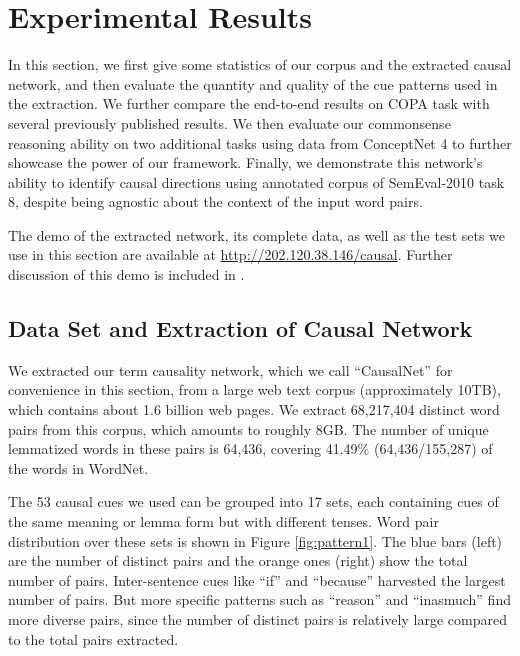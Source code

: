 \section{Experimental Results}
\label{sec:eval} In this section, we first give some statistics of
our corpus and the extracted causal network, and then evaluate the
quantity and quality of the cue patterns used in the extraction. We
further compare the end-to-end results on COPA task with several
previously published results. We then evaluate our commonsense reasoning
ability on two additional tasks using data from ConceptNet 4 to
further showcase the power of our framework. Finally, we demonstrate
this network's ability to identify causal directions
using annotated corpus of SemEval-2010 task 8, despite being
agnostic about the context of the input word pairs.

The demo of the extracted network, its complete data,
as well as the test sets we use in this section
are available at \url{http://202.120.38.146/causal}.
Further discussion of this demo is included
in .

\subsection{Data Set and Extraction of Causal Network}
\label{sec:causalnet}
\begin{figure*}[th]
\centering
{}
\caption{Number of (distinct) pairs extracted by cues}
\label{fig:pattern1}
\end{figure*}
We extracted our term causality network, which we call ``CausalNet''
for convenience in this section, from a large web text corpus (approximately
10TB), %
which contains about 1.6 billion web pages.
We extract 68,217,404 distinct word pairs from this corpus,
which amounts to roughly 8GB. The number of unique lemmatized words
in these pairs is 64,436, covering 41.49\% (64,436/155,287) of the
words in WordNet.

The 53 causal cues we used can be grouped into 17 sets, each
containing cues of the same meaning or lemma form but with different
tenses. Word pair distribution over these sets is shown in Figure
\ref{fig:pattern1}. The blue bars (left) are the number of distinct
pairs and the orange ones (right) show the total number of pairs.
Inter-sentence cues like ``if'' and ``because'' harvested the
largest number of pairs. But more specific patterns such as
``reason'' and ``inasmuch'' find more diverse pairs, since the
number of distinct pairs is relatively large compared to the total
pairs extracted.

